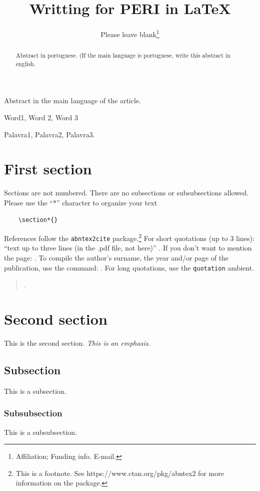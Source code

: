 \documentclass{peri}
\title{Writting for PERI in \LaTeX}
\author{Please leave blank\thanks{Affiliation; Funding info. E-mail.}}
\begin{document}
\maketitle

\begin{resumo}
Abstract in the main language of the article. 
\end{resumo}

\begin{palavraschave} Word1, Word 2, Word 3
\end{palavraschave}

\begin{abstract}
Abstract in portuguese. (If the main language is portuguese, write this abstract in english. \end{abstract}

\begin{keywords}
Palavra1, Palavra2, Palavra3.
\end{keywords}

\section*{First section}

Sections are not numbered. There are no subsections or subsubsections allowed. Please use the ``*'' character to organize your text \begin{verbatim}
    \section*{}
\end{verbatim}

References follow the \texttt{abntex2cite} package.\footnote{This is a footnote. See https://www.ctan.org/pkg/abntex2 for more information on the package.} For short quotations (up to 3 lines): ``text up to three lines (in the .pdf file, not here)'' \cite[p.~1]{template_test}. If you don't want to mention the page: \cite{template_test}. To compile the author's surname, the year and/or page of the publication, use the command: . For long quotations, use the \texttt{quotation} ambient.

\begin{quotation}
\lipsum[3]\cite[pp.~1--2]{template_test}.
\end{quotation}

\section*{Second section}

This is the second section. \textit{This is an emphasis}. 

\subsection*{Subsection}
This is a subsection.
\subsubsection*{Subsubsection}
This is a subsubsection.

\newpage
\end{document}
